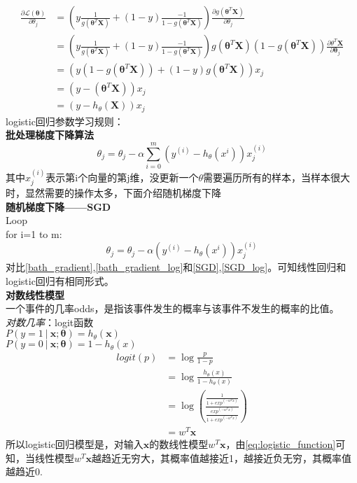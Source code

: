 \documentclass{ctexart}
\begin{document}
    \begin{align}
      \frac{\partial\mathcal L(\bm\theta)}{\partial\theta_j} & =\left (y\frac{1}{g(\bm\theta^T\bm X)} +(1-y)\frac{-1}{1-g(\bm\theta^T\bm X)}\right )\frac{\partial g(\bm\theta^T\bm X)}{\partial\theta_j} \\
      & =\left (y\frac{1}{g(\bm\theta^T\bm X)} +(1-y)\frac{-1}{1-g(\bm\theta^T\bm X)}\right )g(\bm\theta^T\bm X)(1-g(\bm\theta^T\bm X))\frac{\partial\theta^T\bm X}{\partial\bm\theta_j}\\
      & =\left (y(1-g(\bm\theta^T\bm X))+(1-y)g(\bm\theta^T\bm X)\right )x_j \\
      & =(y-(\bm\theta^T\bm X))x_j \\
      & =(y-h_\theta(\bm X))x_j
    \end{align}
    logistic回归参数学习规则：\\
     \textbf{批处理梯度下降算法}
    \begin{equation}\label{bath_gradient_log}
      \theta_j = \theta_j-\alpha\sum_{i=0}^{m}(y^{(i)}-h_\theta(x^{i}) )x_{j}^{(i)}
    \end{equation}
    其中$x_{j}^{(i)}$表示第i个向量的第j维，没更新一个$\theta$需要遍历所有的样本，当样本很大时，显然需要的操作太多，下面介绍随机梯度下降 \\
    \textbf{随机梯度下降——SGD}\\
     Loop \\
      for i=1 to m:
    \begin{equation}\label{SGD_log}
             \theta_j = \theta_j-\alpha( y^{(i)}-h_\theta(x^{i}))x_{j}^{(i)}
    \end{equation}
    对比\ref{bath_gradient},\ref{bath_gradient_log}和\ref{SGD},\ref{SGD_log}。可知线性回归和logistic回归有相同形式。 \\
    \textbf{对数线性模型} \\
    一个事件的几率odds，是指该事件发生的概率与该事件不发生的概率的比值。\\
    \emph{对数几率}：logit函数 \\
    $P(y=1\ |\ \bm x;\bm\theta)=h_\theta(\bm x) $\\
    $P(y=0\ |\ \bm x;\bm\theta)=1-h_\theta(x) $\\
    \begin{align}
      logit(p) & =\log\frac{p}{1-p} \\
       & =\log\frac{h_\theta(x)}{1-h_\theta(x)}  \\
       & = \log \left (\frac{\frac{1}{1+exp^{(-w^Tx)}}}{\frac{exp^{(-w^Tx)}}{1+exp^{(-w^Tx)}}}\right ) \\
       & =w^T\bm x
    \end{align}
    所以logistic回归模型是，对输入$\bm x$的数线性模型$w^T\bm x$，由\ref{eq:logistic_function}可知，当线性模型$w^T\bm x$越趋近无穷大，其概率值越接近1，越接近负无穷，其概率值越趋近0.
\end{document}
